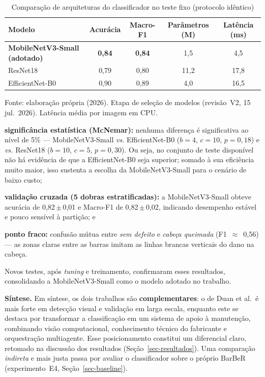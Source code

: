 \documentclass[
	article,			%
	11pt,				%
	oneside,			%
	a4paper,			%
	english,			%
	brazilian,			%
	sumario=tradicional
	]{abntex2}
\begin{document}
\begin{table}[htb]
\centering
\caption{Comparação de arquiteturas do classificador no teste fixo (protocolo idêntico)}
\label{tab-sota-cnn}
\begin{tabular}{@{}lcccc@{}}
\toprule
\textbf{Modelo} & \textbf{Acurácia} & \textbf{Macro-F1} & \textbf{Parâmetros (M)} & \textbf{Latência (ms)}\\
\midrule
\textbf{MobileNetV3-Small (adotado)} & \textbf{0,84} & \textbf{0,84} & 1,5 & 4,5\\
ResNet18 & 0,79 & 0,80 & 11,2 & 17,8\\
EfficientNet-B0 & 0,90 & 0,89 & 4,0 & 16,5\\
\bottomrule
\end{tabular}

\vspace{2pt}
{\footnotesize Fonte: elaboração própria (2026). Etapa de seleção de modelos
(revisão~V2, 15 jul.\ 2026). Latência média por imagem em CPU.}
\end{table}

\begin{alineas}
	\item \textbf{significância estatística (McNemar):} nenhuma diferença é
	significativa ao nível de 5\% --- MobileNetV3-Small \textit{vs.}
	EfficientNet-B0 ($b{=}4$, $c{=}10$, $p{=}0{,}18$) e \textit{vs.} ResNet18
	($b{=}10$, $c{=}5$, $p{=}0{,}30$). Ou seja, no conjunto de teste disponível não
	há evidência de que a EfficientNet-B0 seja superior; somado à sua eficiência
	muito maior, isso sustenta a escolha da MobileNetV3-Small para o cenário de
	baixo custo;
	\item \textbf{validação cruzada (5 dobras estratificadas):} a MobileNetV3-Small
	obteve acurácia de 0,82\,$\pm$\,0,01 e Macro-F1 de 0,82\,$\pm$\,0,02,
	indicando desempenho estável e pouco sensível à partição; e
	\item \textbf{ponto fraco:} confusão mútua entre \emph{sem defeito} e
	\emph{cabeça queimada} (F1~$\approx$~0,56) --- as zonas claras entre as barras
	imitam as linhas brancas verticais do dano na cabeça.
\end{alineas}

\noindent Novos testes, após \textit{tuning} e treinamento, confirmaram esses
resultados, consolidando a MobileNetV3-Small como o modelo adotado no trabalho.

\noindent\textbf{Síntese.} Em síntese, os dois trabalhos são
\textbf{complementares}: o de Duan et al.\ é mais forte em detecção visual e
validação em larga escala, enquanto este se destaca por transformar a
classificação em um sistema de apoio à manutenção, combinando visão computacional,
conhecimento técnico do fabricante e orquestração multiagente. Esse posicionamento
constitui um diferencial claro, retomado na discussão dos resultados
(Seção~\ref{sec-resultados}). Uma comparação \emph{indireta} e mais justa passa por
avaliar o classificador sobre o próprio BarBeR (experimento~E4,
Seção~\ref{sec-baseline}).
\end{document}

